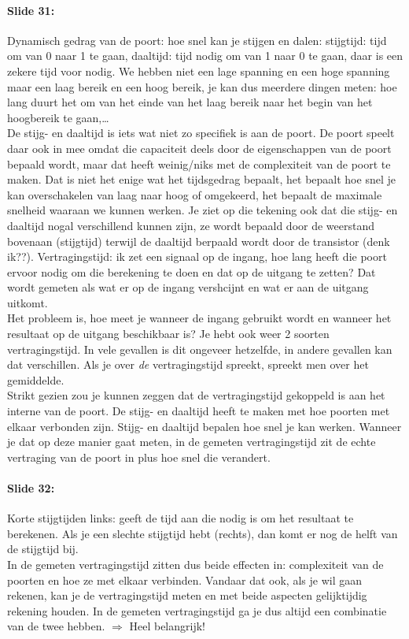 \documentclass[10pt,a4paper]{book}
\begin{document}
\paragraph{Slide 31:} Dynamisch gedrag van de poort: hoe snel kan je stijgen en dalen: stijgtijd: tijd om van 0 naar 1 te gaan, daaltijd: tijd nodig om van 1 naar 0  te gaan, daar is een zekere tijd voor nodig. We hebben niet een lage spanning en een hoge spanning maar een laag bereik en een hoog bereik, je kan dus meerdere dingen meten: hoe lang duurt het om van het einde van het laag bereik naar het begin van het hoogbereik te gaan,\ldots \\
De stijg- en daaltijd is iets wat niet zo specifiek is aan de poort. De poort speelt daar ook in mee omdat die capaciteit deels door de eigenschappen van de poort bepaald wordt, maar dat heeft weinig/niks met de complexiteit van de poort te maken. Dat is niet het enige wat het tijdsgedrag bepaalt, het bepaalt hoe snel je kan overschakelen van laag naar hoog of omgekeerd, het bepaalt de maximale snelheid waaraan we kunnen werken. Je ziet op die tekening ook dat die stijg- en daaltijd nogal verschillend kunnen zijn, ze wordt bepaald door de weerstand bovenaan (stijgtijd) terwijl de daaltijd berpaald wordt door de transistor (denk ik??). %
Vertragingstijd: ik zet een signaal op de ingang, hoe lang heeft die poort ervoor nodig om die berekening te doen en dat op de uitgang te zetten? Dat wordt gemeten als wat er op de ingang vershcijnt en wat er aan de uitgang uitkomt. \\
Het probleem is, hoe meet je wanneer de ingang gebruikt wordt en wanneer het resultaat op de uitgang beschikbaar is? Je hebt ook weer 2 soorten vertragingstijd. In vele gevallen is dit ongeveer hetzelfde, in andere gevallen kan dat verschillen. Als je over \emph{de} vertragingstijd spreekt, spreekt men over het gemiddelde.\\
Strikt gezien zou je kunnen zeggen dat de vertragingstijd gekoppeld is aan het interne van de poort. De stijg- en daaltijd heeft te maken met hoe poorten met elkaar verbonden zijn. Stijg- en daaltijd bepalen hoe snel je kan werken. Wanneer je dat op deze manier gaat meten, in de gemeten vertragingstijd zit de echte vertraging van de poort in plus hoe snel die verandert. 

\paragraph{Slide 32:} Korte stijgtijden links: geeft de tijd aan die nodig is om het resultaat te berekenen. Als je een slechte stijgtijd hebt (rechts), dan komt er nog de helft van de stijgtijd bij. \\
In de gemeten vertragingstijd zitten dus beide effecten in: complexiteit van de poorten en hoe ze met elkaar verbinden. Vandaar dat ook, als je wil gaan rekenen, kan je de vertragingstijd meten en met beide aspecten gelijktijdig rekening houden. In de gemeten vertragingstijd ga je dus altijd een combinatie van de twee hebben. $\Rightarrow$ Heel belangrijk!
\end{document}
